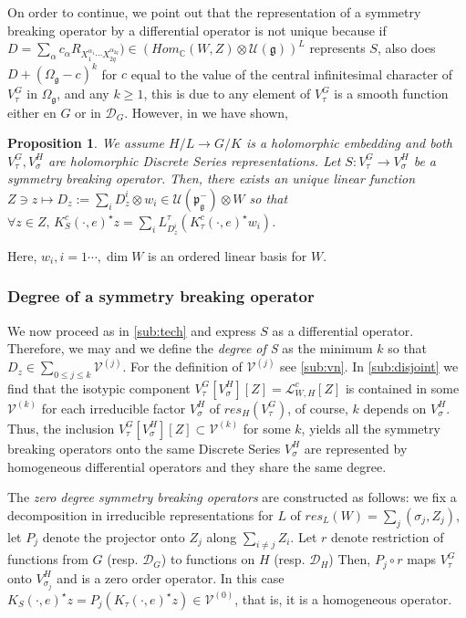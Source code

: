 \documentclass[12pt]{amsart}
\newtheorem{prop}[thm]{Proposition}
\theoremstyle{definition}
\theoremstyle{remark}
\newcommand{\g}{\mathfrak{g}}
\newcommand{\C}{{\mathbb C}}
\numberwithin{equation}{section}
\begin{document}
  On order to continue, we point out that  the representation of a symmetry breaking operator by a differential operator is not unique because if $D=\sum_\alpha c_\alpha R_{X_1^{\alpha_1}\cdots X_{2q}^{\alpha_{2q}}})\in (Hom_\C (W,Z)\otimes \mathcal U(\g))^L$ represents $S$, also does $D + (\Omega_\g -c)^k$ for $c$ equal to the value of the central infinitesimal character of $V_\tau^G$ in $\Omega_\g$, and any $k\geq 1$, this is due  to any element of $V_\tau^G$ is a smooth function either en $G$ or in $\mathcal D_G$. However, in \cite[Proposition 2.12]{OV4} we have shown,
 \begin{prop} \label{prop:uniqness} We assume $H/L \rightarrow G/K$ is a holomorphic embedding and both $V_\tau^G, V_\sigma^H$ are holomorphic Discrete Series representations. Let $S : V_\tau^G \rightarrow V_\sigma^H$ be a symmetry breaking operator. Then, there exists an unique linear function $Z\ni z\mapsto D_z:=\sum_i D_z^i \otimes w_i \in \mathcal U(\mathfrak p_\g^-)\otimes W$ so that $\forall z \in Z, \,K_S^c(\cdot,e)^\star z = \sum_i L_{D_z^i}^\tau (K_\tau^c(\cdot, e)^\star w_i)$.
 \end{prop}

Here, $w_i, i=1\cdots , \dim W$ is an ordered linear basis for $W$.
\subsubsection{Degree of a symmetry breaking operator}\label{sub:degree} We now proceed as in \ref{sub:tech} and express  $S$ as a differential operator. Therefore, we may and we  define the {\it degree of S} as  the minimum $k$ so that $D_z \in \sum_{0\leq j \leq k} \mathcal V^{(j)}$. For the definition of $\mathcal V^{(j)}$ see \ref{sub:vn}. In  \ref{sub:disjoint} we find that the  isotypic component $V_\tau^G[V_\sigma^H][Z] =\mathcal L_{W,H}^c[Z]$ is contained in some $\mathcal V^{(k)}$ for each irreducible factor $V_\sigma^H$ of $res_H(V_\tau^G)$, of course, $k$ depends on $V_\sigma^H$. Thus, the inclusion  $V_\tau^G[V_\sigma^H][Z] \subset \mathcal V^{(k)}$ for some $k$, yields all the symmetry breaking operators onto the same Discrete Series $V_\sigma^H$ are represented by homogeneous differential operators and they share  the same degree.

The {\it zero degree symmetry breaking operators} are constructed as follows: we fix a decomposition in irreducible representations for $L$ of $res_L(W)=\sum_j (\sigma_j, Z_j)$, let $P_j$ denote the projector onto $Z_j$ along $\sum_{i\not= j}Z_i$.  Let $r$ denote restriction of functions  from $G$ (resp. $\mathcal D_G$) to functions on $H$ (resp. $\mathcal D_H$) Then, $P_j \circ r$ maps $ V_\tau^G$ onto $V_{\sigma_j}^H$ and is a zero order operator. In this case $K_S(\cdot,e)^\star z =P_j(K_\tau(\cdot,e)^\star z) \in \mathcal V^{(0)}$, that is, it is a homogeneous operator.
\end{document}
